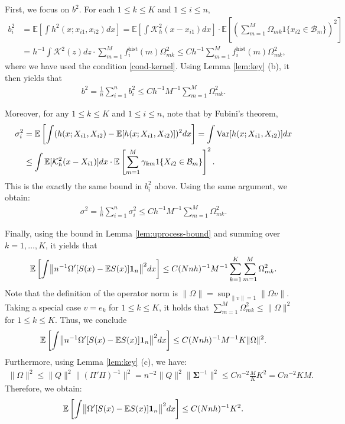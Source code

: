 \documentclass[preprint,11pt]{article}
\newcommand{\mbb}{\mathbb}
\newcommand{\Var}{\text{Var}}
\newcommand{\mcal}{\mathcal}
\numberwithin{equation}{section}
\begin{document}
First, we focus on $b^2$. For each $1\le k\le K$ and $1\le i\le n$, 
    \begin{align*}
         b_i^2&=\mbb{E}\left[\int h^2(x;x_{i1},x_{i2})dx\right]=\mbb{E}\left[\int\mcal{K}^2_h(x-x_{i1})dx\right]\cdot \mbb{E}\left[\left(\sum_{m=1}^M\Omega_{mk}1\{x_{i2}\in\mcal{B}_m\}\right)^2\right]\\
         &=h^{-1}\int \mcal{K}^2(z)dz\cdot \sum_{m=1}^M f_i^{\text{hist}}(m)\Omega_{mk}^2\le Ch^{-1}\sum_{m=1}^M f_i^{\text{hist}}(m)\Omega_{mk}^2,
    \end{align*}
where we have used the condition \eqref{cond-kernel}. Using Lemma \ref{lem:key} (b), it then yields that
\begin{align*}
 b^2 = \frac{1}{n}\sum_{i=1}^n b_i^2\le Ch^{-1}M^{-1}\sum_{m=1}^M\Omega_{mk}^2.
\end{align*}

Moreover, for any $1\le k\le K$ and $1\le i\le n$, note that by Fubini's theorem,
    \begin{align*}
        \sigma_i^2&=\mbb{E}\left[\int (h(x;X_{i1},X_{i2})-\mbb{E}[h(x;X_{i1},X_{i2})])^2dx\right]=\int \Var[h(x;X_{i1},X_{i2})]dx\\
        &\le \int \mbb{E}[{\cal K}^2_h(x-X_{i1})]dx\cdot \mbb{E}\left[\sum_{m=1}^M\gamma_{km} 1\{X_{i2}\in {\cal B}_m\}\right]^2.
    \end{align*}
This is the exactly the same bound in $b_i^2$ above. Using the same argument, we obtain:
\begin{align*}
    \sigma^2=\frac{1}{n}\sum_{i=1}^n \sigma_i^2\le Ch^{-1}M^{-1}\sum_{m=1}^M\Omega_{mk}^2.
\end{align*}

Finally, using the bound in Lemma \ref{lem:uprocess-bound} and summing over $k=1,\ldots,K$, it yields that
\begin{align*}
    \mbb{E}\left[\int \bigl\|n^{-1}\Omega'[S(x)-\mathbb{E}S(x)]{\bf 1}_n\bigr\|^2dx\right]\le C(Nnh)^{-1}M^{-1}\sum_{k=1}^K\sum_{m=1}^M\Omega_{mk}^2.
\end{align*}
Note that the definition of the operator norm is $\|\Omega\|=\sup_{\|v\|=1}\|\Omega v\|$. Taking a special case $v=e_k$ for $1\le k\le K$, it holds that $\sum_{m=1}^M \Omega_{mk}^2\le \|\Omega\|^2$ for $1\le k\le K$. Thus, we conclude
\begin{align*}
    \mbb{E}\left[\int \bigl\|n^{-1}\Omega'[S(x)-\mathbb{E}S(x)]{\bf 1}_n\bigr\|^2dx\right]\le C(Nnh)^{-1}M^{-1}K\|\Omega\|^2.
\end{align*}
Furthermore, using Lemma \ref{lem:key} (c), we have:
\begin{align*}
    \|\Omega\|^2\le \|Q\|^2\|(\Pi'\Pi)^{-1}\|^2= n^{-2}\|Q\|^2\|\bm{\Sigma}^{-1}\|^2\le Cn^{-2}\frac{M}{K}K^2=Cn^{-2}KM.    
\end{align*}
Therefore, we obtain:
\begin{align*}
    \mbb{E}\left[\int \bigl\|\Omega'[S(x)-\mathbb{E}S(x)]{\bf 1}_n\bigr\|^2dx\right]\le C(Nnh)^{-1}K^2.
\end{align*}
\end{document}
